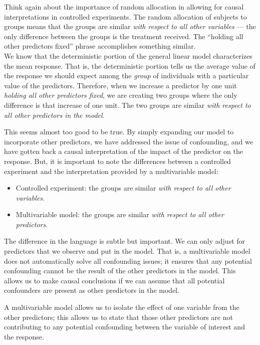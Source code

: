 \documentclass[
  letterpaper,
  DIV=11,
  numbers=noendperiod]{scrreprt}
\providecommand{\tightlist}{%
  \setlength{\itemsep}{0pt}\setlength{\parskip}{0pt}}\usepackage{longtable,booktabs,array}
\theoremstyle{definition}
\theoremstyle{definition}
\theoremstyle{remark}
\begin{document}
Think again about the importance of random allocation in allowing for
causal interpretations in controlled experiments. The random allocation
of subjects to groups means that the groups are similar \emph{with
respect to all other variables} --- the only difference between the
groups is the treatment received. The ``holding all other predictors
fixed'' phrase accomplishes something similar.\\
We know that the deterministic portion of the general linear model
characterizes the mean response. That is, the deterministic portion
tells us the average value of the response we should expect among the
\emph{group} of individuals with a particular value of the predictors.
Therefore, when we increase a predictor by one unit \emph{holding all
other predictors fixed}, we are creating two groups where the only
difference is that increase of one unit. The two groups are similar
\emph{with respect to all other predictors in the model}.

This seems almost too good to be true. By simply expanding our model to
incorporate other predictors, we have addressed the issue of
confounding, and we have gotten back a causal interpretation of the
impact of the predictor on the response. But, it is important to note
the differences between a controlled experiment and the interpretation
provided by a multivariable model:

\begin{itemize}
\tightlist
\item
  Controlled experiment: the groups are similar \emph{with respect to
  all other variables}.
\item
  Multivariable model: the groups are similar \emph{with respect to all
  other predictors}.
\end{itemize}

The difference in the language is subtle but important. We can only
adjust for predictors that we observe and put in the model. That is, a
multivariable model does not automatically solve all confounding issues;
it ensures that any potential confounding cannot be the result of the
other predictors in the model. This allows us to make causal conclusions
if we can assume that all potential confounders are present as other
predictors in the model.

\begin{tcolorbox}[enhanced jigsaw, left=2mm, toprule=.15mm, arc=.35mm, breakable, opacitybacktitle=0.6, opacityback=0, rightrule=.15mm, colbacktitle=quarto-callout-tip-color!10!white, coltitle=black, leftrule=.75mm, toptitle=1mm, colframe=quarto-callout-tip-color-frame, titlerule=0mm, title=\textcolor{quarto-callout-tip-color}{\faLightbulb}\hspace{0.5em}{Big Idea}, bottomrule=.15mm, colback=white, bottomtitle=1mm]

A multivariable model allows us to isolate the effect of one variable
from the other predictors; this allows us to state that those other
predictors are not contributing to any potential confounding between the
variable of interest and the response.

\end{tcolorbox}
\end{document}
